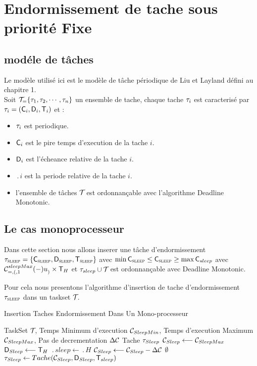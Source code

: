 \chapter{Endormissement de tache sous priorité Fixe}
\minitoc
\section{modéle de tâches}
Le modèle utilisé ici est le modèle de tâche périodique de Liu et
Layland défini au chapitre 1.\\ Soit $\mathcal{T}_{=}
\{\tau_{1},\tau_{2},\cdots,\tau_{n}\}$ un ensemble de tache, chaque
tache $\tau_{i}$ est caracterisé par $\tau_{i} =
(\mathsf{C}_{i},\mathsf{D}_{i},\mathsf{T}_{i})$ et :
\begin{itemize}
\item $\tau_{i}$ est periodique.
\item $\mathsf{C}_{i}$ est le pire temps d'execution de la tache $i$.
\item $\mathsf{D}_{i}$ est l'écheance relative de la tache $i$.
\item $\period{i}$ est la periode relative de la tache $i$.
\item l'ensemble de tâches $\mathcal{T}_{}$ est ordonnançable avec
  l'algorithme Deadline Monotonic.
\end{itemize}
\section{Le cas monoprocesseur}
Dans cette section nous allons inserer une tâche d'endormissement
$\tau_{\textsc{sleep}} = \{ \mathsf{C}_{\textsc{sleep}}, \mathsf{D}_{\textsc{sleep}},
\mathsf{T}_{\textsc{sleep}}\}$ avec $\min \mathsf{C}_{\textsc{sleep}} \leq \mathsf{C}_{\textsc{sleep}}
\geq \max \mathsf{C}_{sleep}$ avec $\mathcal{C}^{sleepMax}_{=,(,1}(-)u^{}_{)} \times
\mathsf{T}_{H}$ et $\tau_{sleep} \cup \mathcal{T}_{}$ est ordonnançable avec
Deadline Monotonic.


Pour cela nous presentons l'algorithme d'insertion de tache
d'endormissement $\tau_{\textsc{sleep}}$ dans un taskset $\mathcal{T}_{}$.



\begin{algorithm}
\caption{Insertion Taches Endormissement Dans Un Mono-processeur}
\label{dmup}
\begin{algorithmic}
\State TaskSet $\mathcal{T}_{}$, Temps Minimum d'execution $\mathcal{C}_{SleepMin}$, Temps d'execution Maximum $\mathcal{C}_{SleepMax}$, Pas de decrementation $\Delta \mathcal{C}_{}$
\State Tache $\tau_{Sleep}$
\State $\mathcal{C}_{Sleep}  \longleftarrow \mathcal{C}_{SleepMax}$ 
\State $\mathsf{D}_{Sleep}	\longleftarrow \mathsf{T}_{H}$ 
\State $\period{sleep} \longleftarrow \period{H}$ 
\State $\mathcal{C}_{Sleep} \longleftarrow \mathcal{C}_{Sleep} - \Delta \mathcal{C}_{}$ 
\EndWhile 
{}
\State $\emptyset$
\EndIf
\State $\tau_{Sleep} \leftarrow Tache(\mathcal{C}_{Sleep},\mathsf{D}_{Sleep},\mathsf{T}_{sleep})$
\end{algorithmic}
\end{algorithm}

